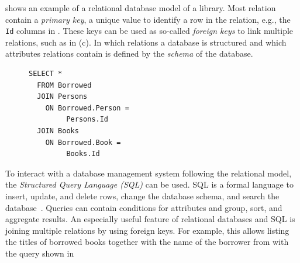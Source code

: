  shows an example of a relational
database model of a library. Most relation contain a \emph{primary
  key}, a unique value to identify a row in the relation, e.g., the
\texttt{Id} columns in . These keys
can be used as so-called \emph{foreign keys} to
link multiple relations, such as in
(c). In which relations a database is
structured and which attributes relations contain is defined by the
\emph{schema} of the database.
\begin{figure}
  \vspace{-0.4cm}
\begin{lstlisting}[style=SmallJSON,
  caption={SQL query},
  label=lst:sql,
  framexleftmargin=1pt, xleftmargin=0pt,
 morekeywords={}, numbers=none]
SELECT *
  FROM Borrowed
  JOIN Persons
    ON Borrowed.Person =
         Persons.Id
  JOIN Books
    ON Borrowed.Book = 
         Books.Id
\end{lstlisting}
\vspace{-8mm}
\end{figure}
To interact with a database management
system following the relational model, the \emph{Structured Query
  Language (SQL)} can be used. SQL is a formal language to insert,
update, and delete rows, change the database schema, and search the
database~\cite{database-def}. Queries can contain conditions for
attributes and group, sort, and aggregate results. An especially useful
feature of relational databases and SQL is joining multiple relations
by using foreign keys. For example, this allows listing the titles of
borrowed books together with the name of the borrower from
 with the query shown in 

